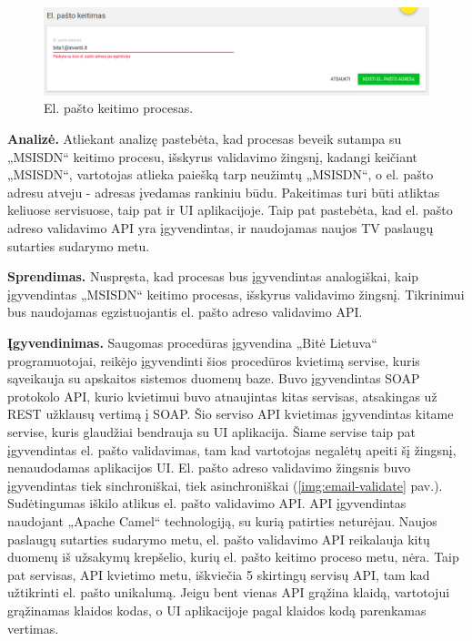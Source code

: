 \begin{figure}[H]
    \centering
    \includegraphics[scale=0.3]{img/email-change.png}
    \caption{El. pašto keitimo procesas.}
    \label{img:email-change}
\end{figure}

\textbf{Analizė.}
Atliekant analizę pastebėta, kad procesas beveik sutampa su „MSISDN“ keitimo procesu, išskyrus validavimo žingsnį, kadangi keičiant „MSISDN“,
vartotojas atlieka paiešką tarp neužimtų „MSISDN“, o el. pašto adresu atveju - adresas įvedamas rankiniu būdu. Pakeitimas turi būti atliktas keliuose servisuose,
taip pat ir UI aplikacijoje. Taip pat pastebėta, kad el. pašto adreso validavimo API yra įgyvendintas, ir naudojamas naujos TV paslaugų sutarties sudarymo metu.

\textbf{Sprendimas.}
Nuspręsta, kad procesas bus įgyvendintas analogiškai, kaip įgyvendintas „MSISDN“ keitimo procesas, išskyrus validavimo žingsnį. Tikrinimui bus naudojamas
egzistuojantis el. pašto adreso validavimo API.

\textbf{Įgyvendinimas.}
Saugomas procedūras įgyvendina „Bitė Lietuva“ programuotojai, reikėjo įgyvendinti šios procedūros kvietimą servise, kuris sąveikauja su apskaitos sistemos duomenų baze.
Buvo įgyvendintas SOAP protokolo API, kurio kvietimui buvo atnaujintas kitas servisas, atsakingas už REST užklausų vertimą į SOAP. Šio serviso API kvietimas įgyvendintas
kitame servise, kuris glaudžiai bendrauja su UI aplikacija. Šiame servise taip pat įgyvendintas el. pašto validavimas, tam kad vartotojas negalėtų apeiti šį žingsnį,
nenaudodamas aplikacijos UI. El. pašto adreso validavimo žingsnis buvo įgyvendintas tiek sinchroniškai, tiek asinchroniškai (\ref{img:email-validate} pav.).
Sudėtingumas iškilo atlikus el. pašto validavimo API. API įgyvendintas naudojant „Apache Camel“ technologiją, su kurią patirties neturėjau.
Naujos paslaugų sutarties sudarymo metu, el. pašto validavimo API reikalauja kitų duomenų iš užsakymų krepšelio, kurių el. pašto keitimo proceso metu, nėra.
Taip pat servisas, API kvietimo metu, iškviečia 5 skirtingų servisų API, tam kad užtikrinti el. pašto unikalumą. Jeigu bent vienas API grąžina klaidą, vartotojui grąžinamas
klaidos kodas, o UI aplikacijoje pagal klaidos kodą parenkamas vertimas.

